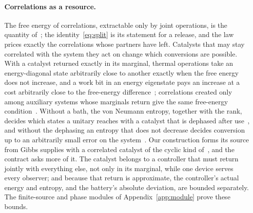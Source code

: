 \paragraph{Correlations as a resource.} The free energy of correlations, extractable only by joint operations, is the quantity of~\cite{PerarnauLlobet15}; the identity~\eqref{eq:split} is its statement for a release, and the law prices exactly the correlations whose partners have left. Catalysts that may stay correlated with the system they act on change which conversions are possible. With a catalyst returned exactly in its marginal, thermal operations take an energy-diagonal state arbitrarily close to another exactly when the free energy does not increase, and a work bit in an energy eigenstate pays an increase at a cost arbitrarily close to the free-energy difference~\cite{Muller18}; correlations created only among auxiliary systems whose marginals return give the same free-energy condition~\cite{LostaglioMullerPastena15}. Without a bath, the von Neumann entropy, together with the rank, decides which states a unitary reaches with a catalyst that is dephased after use~\cite{Boes19}, and without the dephasing an entropy that does not decrease decides conversion up to an arbitrarily small error on the system~\cite{Wilming21}. Our construction forms its source from Gibbs supplies with a correlated catalyst of the cyclic kind of~\cite{Duan05,ShiraishiSagawa21}, and the contract asks more of it. The catalyst belongs to a controller that must return jointly with everything else, not only in its marginal, while one device serves every observer; and because that return is approximate, the controller's actual energy and entropy, and the battery's absolute deviation, are bounded separately. The finite-source and phase modules of Appendix~\ref{app:module} prove these bounds.

